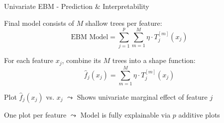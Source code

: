 \documentclass[10pt,compress,t,notes=noshow, xcolor=table]{beamer}
\begin{document}
\begin{framev}[align=top]{Univariate EBM - Prediction \& Interpretability}
\begin{itemizeM}
\item Final model consists of $M$ shallow trees per feature:
$$
\text{EBM Model} = \sum_{j=1}^p \sum_{m=1}^M \eta \cdot T_j^{[m]}(x_j)
$$
\item For each feature $x_j$, combine its $M$ trees into a shape function:
$$
\hat{f}_j(x_j) = \sum_{m=1}^M \eta \cdot T_j^{[m]}(x_j)
$$
\item Plot $\hat{f}_j(x_j)$ vs. $x_j$ $\leadsto$ Shows univariate marginal effect of feature $j$
\item One plot per feature $\leadsto$ Model is fully explainable via $p$ additive plots
\end{itemizeM}
\spacer[0.25]
\end{framev}


\end{document}
